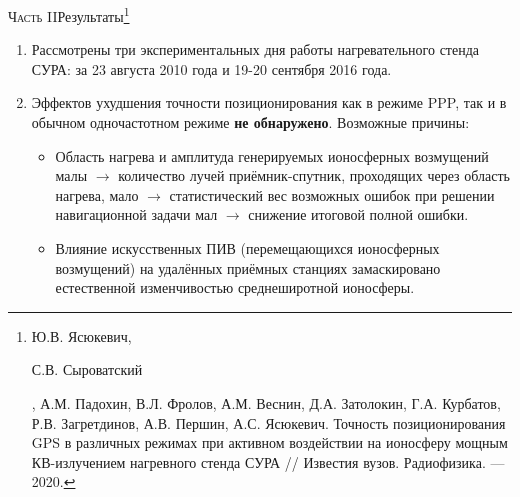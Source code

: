 \begin{frame}{\textsc{Часть II}}{Результаты\footnote[1]{{\tiny\justifying Ю.В. Ясюкевич, \begin{bf}С.В. Сыроватский\end{bf}, А.М. Падохин, В.Л. Фролов, А.М. Веснин, Д.А. Затолокин, Г.А. Курбатов, Р.В. Загретдинов, А.В. Першин, А.С. Ясюкевич. Точность позиционирования GPS в различных режимах при активном воздействии на ионосферу мощным КВ-излучением нагревного стенда СУРА // Известия вузов. Радиофизика. --- 2020.}}}
\begin{enumerate}
\justifying
\item Рассмотрены три экспериментальных дня работы нагревательного стенда СУРА: за 23 августа 2010 года и 19-20 сентября 2016 года.
\item Эффектов ухудшения точности позиционирования как в режиме PPP, так и в обычном одночастотном режиме \textbf{не обнаружено}.
Возможные причины:
\begin{itemize}
\justifying
\item Область нагрева и амплитуда генерируемых ионосферных возмущений малы $\rightarrow$ количество лучей приёмник-спутник, проходящих через область нагрева, мало $\rightarrow$ статистический вес возможных ошибок при решении навигационной задачи мал $\rightarrow$ снижение итоговой полной ошибки.  
\item Влияние искусственных ПИВ (перемещающихся ионосферных возмущений) на удалённых приёмных станциях замаскировано естественной изменчивостью среднеширотной ионосферы.
\end{itemize}
\end{enumerate}
\end{frame}